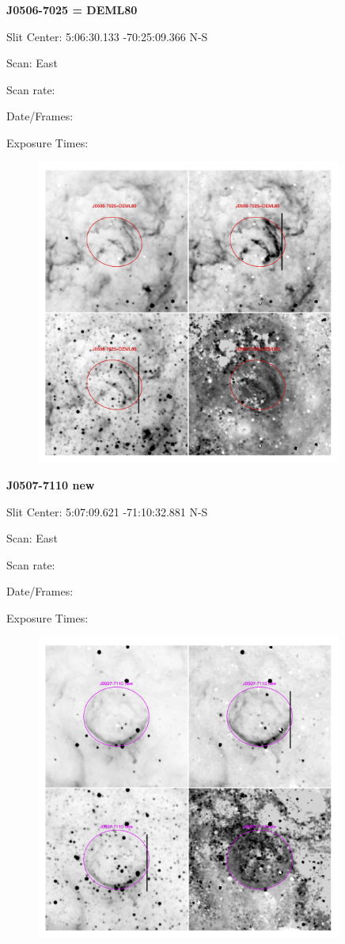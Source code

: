 \documentclass[11pt]{article}
\begin{document}
\newpage
{\bf J0506-7025 = DEML80}  
 
Slit Center:   5:06:30.133    -70:25:09.366     N-S

Scan:  East

Scan rate:  

Date/Frames:

Exposure Times:  

\begin{figure}
\includegraphics[width=10.05cm]{snapshots/J0506-7025.png}
\end{figure}

\newpage
{\bf J0507-7110 new}  
 
Slit Center:   5:07:09.621   -71:10:32.881     N-S

Scan:  East

Scan rate:  

Date/Frames:

Exposure Times:  

\begin{figure}
\includegraphics[width=10.05cm]{snapshots/J0507-7110.png}
\end{figure}
\end{document}
